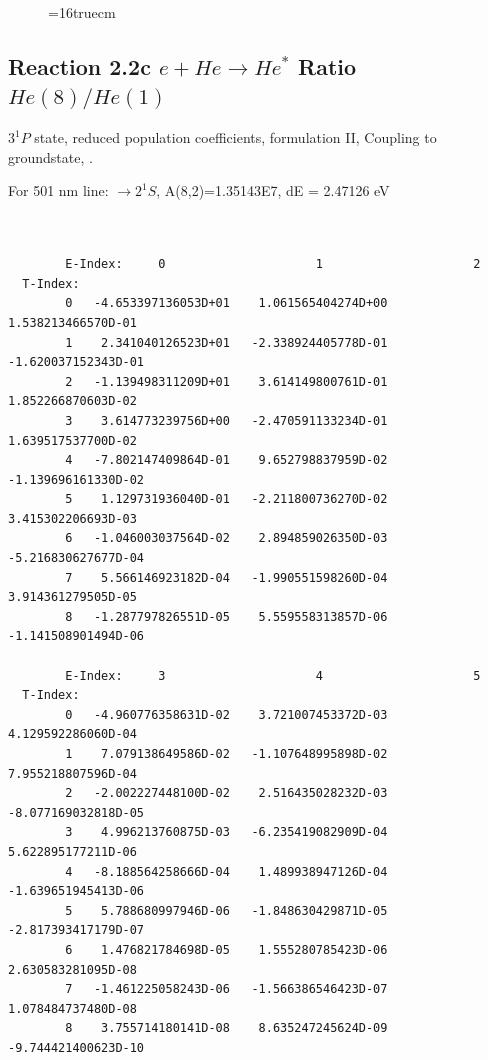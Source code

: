 \documentclass[12pt,dvipdfmx]{article}
\begin{document}
\begin{figure} \label{2.2b}
\epsfxsize=16truecm
\end{figure}
\newpage


\subsection{
  Reaction 2.2c $e + He \rightarrow He^*  $ Ratio $He(8)/He(1)$
}

  $3^1P$ state,
  reduced population coefficients, formulation II,
  Coupling to groundstate, \cite{kn:Fujimoto}.

  For 501 nm line: $\rightarrow 2^1S$, A(8,2)=1.35143E7, dE = 2.47126 eV

\begin{small}\begin{verbatim}


        E-Index:     0                     1                     2
  T-Index:
        0   -4.653397136053D+01    1.061565404274D+00    1.538213466570D-01
        1    2.341040126523D+01   -2.338924405778D-01   -1.620037152343D-01
        2   -1.139498311209D+01    3.614149800761D-01    1.852266870603D-02
        3    3.614773239756D+00   -2.470591133234D-01    1.639517537700D-02
        4   -7.802147409864D-01    9.652798837959D-02   -1.139696161330D-02
        5    1.129731936040D-01   -2.211800736270D-02    3.415302206693D-03
        6   -1.046003037564D-02    2.894859026350D-03   -5.216830627677D-04
        7    5.566146923182D-04   -1.990551598260D-04    3.914361279505D-05
        8   -1.287797826551D-05    5.559558313857D-06   -1.141508901494D-06

        E-Index:     3                     4                     5
  T-Index:
        0   -4.960776358631D-02    3.721007453372D-03    4.129592286060D-04
        1    7.079138649586D-02   -1.107648995898D-02    7.955218807596D-04
        2   -2.002227448100D-02    2.516435028232D-03   -8.077169032818D-05
        3    4.996213760875D-03   -6.235419082909D-04    5.622895177211D-06
        4   -8.188564258666D-04    1.489938947126D-04   -1.639651945413D-06
        5    5.788680997946D-06   -1.848630429871D-05   -2.817393417179D-07
        6    1.476821784698D-05    1.555280785423D-06    2.630583281095D-08
        7   -1.461225058243D-06   -1.566386546423D-07    1.078484737480D-08
        8    3.755714180141D-08    8.635247245624D-09   -9.744421400623D-10


\end{verbatim}
\end{small}
\end{document}
